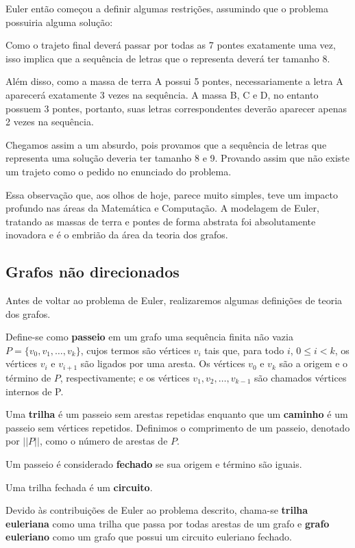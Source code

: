 \documentclass[12pt, a4paper]{article}
\begin{document}
Euler então começou a definir algumas restrições, assumindo que o problema possuiria alguma solução:

Como o trajeto final deverá passar por todas as 7 pontes exatamente uma vez, isso implica que a sequência de letras que o representa deverá ter tamanho 8.

Além disso, como a massa de terra A possui 5 pontes, necessariamente a letra A aparecerá exatamente 3 vezes na sequência.
A massa B, C e D, no entanto possuem 3 pontes, portanto, suas letras correspondentes deverão aparecer apenas 2 vezes na sequência. 

Chegamos assim a um absurdo, pois provamos que a sequência de letras que representa uma solução deveria ter tamanho 8 e 9.
Provando assim que não existe um trajeto como o pedido no enunciado do problema.

Essa observação que, aos olhos de hoje, parece muito simples, teve um impacto profundo nas áreas da Matemática e Computação.
A modelagem de Euler, tratando as massas de terra e pontes de forma abstrata foi absolutamente inovadora e é o embrião da área da teoria dos grafos.

\subsection{Grafos não direcionados}

Antes de voltar ao problema de Euler, realizaremos algumas definições de teoria dos grafos.

Define-se como \textbf{passeio} em um grafo uma sequência finita não vazia $P = \{ v_0, v_1, \dots, v_k\}$, cujos termos são vértices $v_i$ tais que, para todo $i$, $0 \leq i < k$, os vértices $v_{i}$ e $v_{i+1}$ são ligados por uma aresta. 
Os vértices $v_0$ e $v_k$ são a origem e o término de $P$, respectivamente; e os vértices $v_1, v_2, \dots, v_{k-1}$ são chamados vértices internos de P. 

Uma \textbf{trilha} é um passeio sem arestas repetidas enquanto que um \textbf{caminho} é um passeio sem vértices repetidos.
Definimos o comprimento de um passeio, denotado por $||P||$, como o número de arestas de $P$.

Um passeio é considerado \textbf{fechado} se sua origem e término são iguais.

Uma trilha fechada é um \textbf{circuito}.

Devido às contribuições de Euler ao problema descrito, chama-se \textbf{trilha euleriana} como uma trilha que passa por todas arestas de um grafo e \textbf{grafo euleriano} como um grafo que possui um circuito euleriano fechado.
\end{document}
